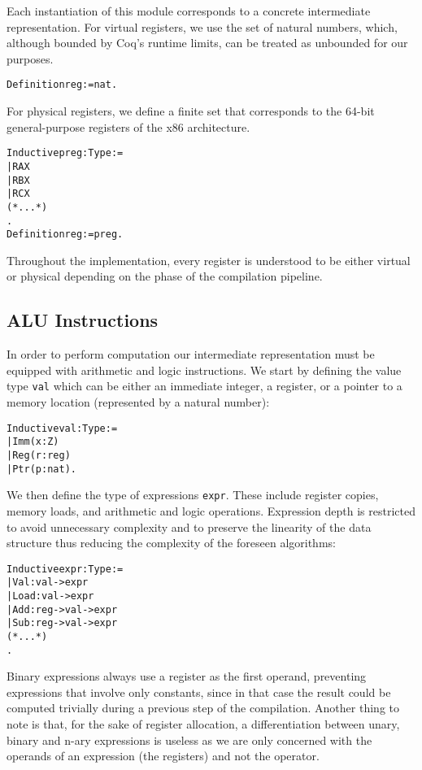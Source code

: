 Each instantiation of this module corresponds to a concrete intermediate representation. For virtual registers, we use the set of natural numbers, which, although bounded by Coq's runtime limits, can be treated as unbounded for our purposes.

\begin{alltt}
Definition reg := nat.
\end{alltt}

For physical registers, we define a finite set that corresponds to the 64-bit general-purpose registers of the x86 architecture.

\begin{alltt}
Inductive preg : Type :=
  | RAX
  | RBX
  | RCX
  (* ... *)
.
Definition reg := preg.
\end{alltt}

Throughout the implementation, every register is understood to be either virtual or physical depending on the phase of the compilation pipeline.

\subsection{ALU Instructions}

In order to perform computation our intermediate representation must be equipped with arithmetic and logic instructions.
We start by defining the value type \texttt{val} which can be either an immediate integer, a register, or a pointer to a memory location (represented by a natural number):

\begin{alltt}
Inductive val : Type :=
  | Imm (x : Z)
  | Reg (r : reg)
  | Ptr (p : nat).
\end{alltt}

We then define the type of expressions \texttt{expr}. These include register copies, memory loads, and arithmetic and logic operations. Expression depth is restricted to avoid unnecessary complexity and to preserve the linearity of the data structure thus reducing the complexity of the foreseen algorithms:

\begin{alltt}
Inductive expr : Type :=
  | Val : val -> expr
  | Load : val -> expr
  | Add : reg -> val -> expr
  | Sub : reg -> val -> expr
  (* ... *)
.
\end{alltt}

Binary expressions always use a register as the first operand, preventing expressions that involve only constants, since in that case the result could be computed trivially during a previous step of the compilation. Another thing to note is that, for the sake of register allocation, a differentiation between unary, binary and n-ary expressions is useless as we are only concerned with the operands of an expression (the registers) and not the operator.

